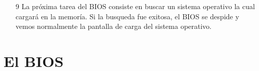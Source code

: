 \documentclass[12pt,oneside,a4paper]{article}
\begin{document}
\begin{enumerate}
	
	
	
	

	\item[9] La próxima tarea del BIOS consiste en buscar un sistema operativo
		la cual cargará en la memoría. Si la busqueda fue exitosa, el BIOS se despide
		y vemos normalmente la pantalla de carga del sistema operativo.

	\end{enumerate}
	\newpage

\section{El BIOS}{\label{sec:bios}}
\end{document}

